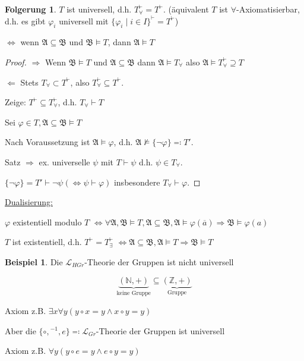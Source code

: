 \documentclass[12pt,parskip=full]{scrartcl}
\newcommand{\setN}{\mathbb{N}}
\newcommand{\setZ}{\mathbb{Z}}
\newcommand{\heading}{\underline}
\theoremstyle{definition}
\newtheorem{corollary}[theorem]{Folgerung}
\newtheorem{example}[theorem]{Beispiel}
\begin{document}
	\begin{corollary}
		$T$ ist universell, d.h. $T_\forall^\vdash = T^\vdash$. (äquivalent $T$ ist $\forall$-Axiomatisierbar, d.h. es gibt $\varphi_i$ universell mit $\{ \varphi_i \mid i \in I \}^\vdash = T^\vdash$)
		
		$\Leftrightarrow$ wenn $\mathfrak{A} \subseteq \mathfrak{B}$ und $\mathfrak{B} \models T$, dann $\mathfrak{A} \models T$
	\end{corollary}
	\begin{proof}
		\heading{$\Rightarrow$} Wenn $\mathfrak{B} \models T$ und $\mathfrak{A} \subseteq \mathfrak{B}$ dann $\mathfrak{A} \models T_\forall$ also $\mathfrak{A} \models T_\forall^\vdash \supseteq T$
		
		\heading{$\Leftarrow$} Stets $T_\forall \subset T^\vdash$, also $T_\forall^\vdash \subseteq T^\vdash$.
		
		Zeige: $T^\vdash \subseteq T_\forall^\vdash$, d.h. $T_\forall \vdash T$
		
		Sei $\varphi \in T, \mathfrak{A} \subseteq \mathfrak{B} \models T$
		
		Nach Voraussetzung ist $\mathfrak{A} \models \varphi$, d.h. $\mathfrak{A} \not\models \{ \lnot \varphi \} \eqqcolon T'$.
		
		Satz $\Rightarrow$ ex. universelle $\psi$ mit $T \vdash \psi$ d.h. $\psi \in T_\forall$.
		
		$\{ \lnot \varphi \} = T' \vdash \lnot \psi (\Leftrightarrow \psi \vdash \varphi)$ insbesondere $T_\forall \vdash \varphi$.
	\end{proof}

	\heading{Dualisierung:}
	
	$\varphi$ existentiell modulo $T$ $\Leftrightarrow \forall \mathfrak{A}, \mathfrak{B} \models T, \mathfrak{A} \subseteq \mathfrak{B}, \mathfrak{A} \models \varphi(\overline{a}) \Rightarrow \mathfrak{B} \models \varphi(a)$
	
	$T$ ist existentiell, d.h. $T^\vdash = T_\exists^\vdash$ $\Leftrightarrow \mathfrak{A} \subseteq \mathfrak{B}, \mathfrak{A} \models T \Rightarrow \mathfrak{B} \models T$
	
	\begin{example}
		Die $\mathcal{L}_{HGr}$-Theorie der Gruppen ist nicht universell
		
		\begin{equation*}
			\underbrace{(\setN, +)}_\text{keine Gruppe} \subseteq \underbrace{(\setZ, +)}_\text{Gruppe}
		\end{equation*}
		
		Axiom z.B. $\exists x \forall y (y \circ x = y \land x \circ y = y)$
		
		Aber die $\{ \circ, {}^{-1}, e \} \eqqcolon \mathcal{L}_{Gr}$-Theorie der Gruppen ist universell
		
		Axiom z.B. $\forall y (y \circ e = y \land e \circ y = y)$
	\end{example}
	
\end{document}

